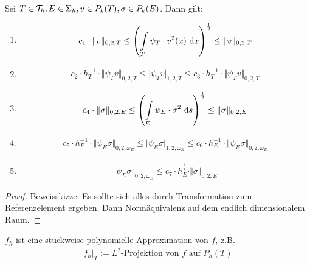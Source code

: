 \begin{theorem}
	Sei $T\in\mathcal{T}_h,E\in\Sigma_h, v\in P_k(T), \sigma\in P_k(E)$. Dann gilt:
	\begin{enumerate}[label=(\arabic*)]
		\item
		\begin{align*}
			c_1\cdot\Vert v\Vert_{0,2,T}
			\leq\left(\int\limits_T\psi_T\cdot v^2(x)\text{ d} x\right)^{\frac{1}{2}} \leq\Vert v\Vert_{0,2,T}
		\end{align*}
		\item
		\begin{align*}
			c_2\cdot h_T^{-1}\cdot\big\Vert\psi_T v\big\Vert_{0,2,T}\leq\big|\psi_T v\big|_{1,2,T}\leq c_3\cdot h_T^{-1}\cdot\big\Vert\psi_T v\big\Vert_{0,2,T}
		\end{align*}
		\item
		\begin{align*}
			c_4\cdot\Vert\sigma\Vert_{0,2,E} \leq\left(\int\limits_E\psi_E\cdot\sigma^2\text{ d} s\right)^{\frac{1}{2}}\leq \Vert\sigma\Vert_{0,2,E}
		\end{align*}
		\item
		\begin{align*}
			c_5\cdot h_E^{-1}\cdot\big\Vert\psi_E\sigma\big\Vert_{0,2,\omega_E}
			\leq\big|\psi_E\sigma\big|_{1,2,\omega_E}
			\leq c_6\cdot h_E^{-1}\cdot\big\Vert\psi_E\sigma\big\Vert_{0,2,\omega_E}
		\end{align*}
		\item
		\begin{align*}
			\big\Vert\psi_E\sigma\big\Vert_{0,2,\omega_E}
			\leq c_7\cdot h_E^{\frac{1}{2}}\cdot\Vert\sigma\Vert_{0,2,E}
		\end{align*}
	\end{enumerate}
\end{theorem}
\begin{proof}
	Beweisskizze: Es sollte sich alles durch Transformation zum Referenzelement ergeben. Dann Normäquivalenz auf dem endlich dimensionalem Raum.
\end{proof}

$f_h$ ist eine stückweise  polynomielle Approximation von $f$, z.B.
\begin{align*}
	f_h\big|_T:=L^2\text{-Projektion von $f$ auf }P_h(T)
\end{align*}

